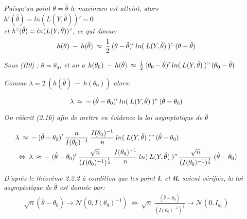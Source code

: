 \documentclass[11pt,fleqn]{book} %
\begin{document}
\textit{Puisqu'au point $\theta=\hat{\theta}$ le maximum est atteint, alors $h'(\hat{\theta})=ln(L(Y,\hat{\theta}))'=0$\\ 
et $h"(\hat{\theta})=ln(L(Y,\hat{\theta}))"$, ce qui donne:\\}
\[ 
h(\theta)\:-\:h(\hat{\theta})\:\approx\: \frac{1}{2} \:(\theta-\hat{\theta})'\:ln(\:L(Y,\hat{\theta})\:)"\:(\theta-\hat{\theta})
\]

\textit{Sous (H0) : $\theta=\theta_0$, et on a $h(\theta_0)\:-\:h(\hat{\theta})\:\approx\: \frac{1}{2}\:(\theta_0-\hat{\theta})'\:ln(\:L(Y,\hat{\theta})\:)"\:(\theta_0-\hat{\theta})$} 

\vspace{1em}

\textit{Comme $\lambda=2\:\left( h(\hat{\theta})\:-\:h(\theta_0)\right)$ alors:}

\begin{equation}
\lambda\:\approx\:-\:(\hat{\theta}-\theta_0)'\:ln(\:L(Y,\hat{\theta})\:)"\:(\hat{\theta}-\theta_0)
\end{equation}

\vspace{0.5em}

\textit{On réécrit (2.16) afin de mettre en évidence la loi asymptotique de $\hat{\theta}$}

\begin{align*}
&\lambda\:\approx\:-\:(\hat{\theta}-\theta_0)'\:\frac{n}{I(\theta_0)^{-1}}\:\frac{I(\theta_0)^{-1}}{n}\:ln(\:L(Y,\hat{\theta})\:)"\:(\hat{\theta}-\theta_0)\\
&\:\Leftrightarrow\: \lambda\:\approx\:-\:(\hat{\theta}-\theta_0)'\:\frac{\sqrt{n}}{(I(\theta_0)^{-1})^{\frac{1}{2}}}\:\frac{I(\theta_0)^{-1}}{n}\:ln(\:L(Y,\hat{\theta})\:)"\:\frac{\sqrt{n}}{(I(\theta_0)^{-1})^{\frac{1}{2}}}\:(\hat{\theta}-\theta_0)
\end{align*}

\vspace{0.5em}

\textit{D'après le théorème 2.2.2 à condition que les point \textbf{i.} et \textbf{ii.} soient vérifiés, la loi asymptotique de $\hat{\theta}$ est donnée par:}
\begin{align*}
 \sqrt{n}(\hat{\theta}-\theta_0)\rightarrow \mathcal{N}(0,I(\theta_0)^{-1}) \:\Leftrightarrow\: \sqrt{n}\:\frac{(\hat{\theta}-\theta_0)}{(I(\theta_0)^{-1})^{\frac{1}{2}}}\rightarrow \mathcal{N}(0,I_{d_0})
\end{align*}

\vspace{0.5em}
\end{document}
